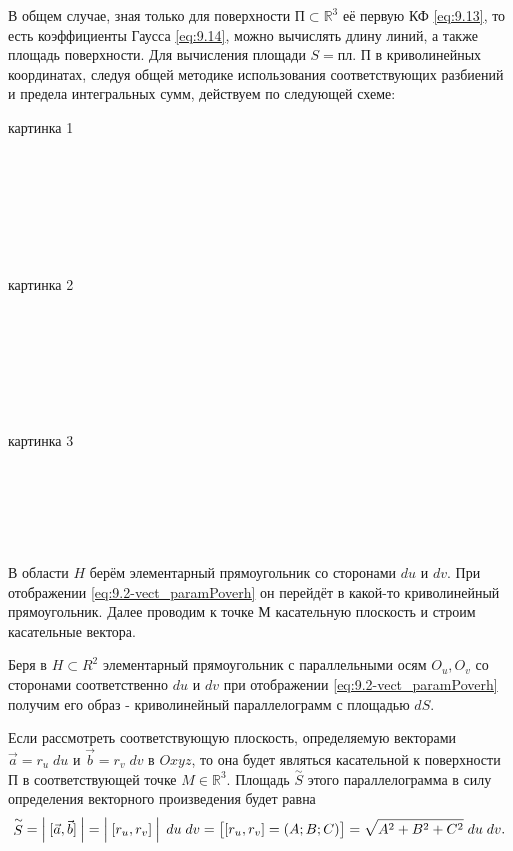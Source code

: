 \begin{example}
    В общем случае, зная только для поверхности  $ \text{П} \subset \mathbb{R}^3 $ её первую КФ \eqref{eq:9.13}, то есть коэффициенты Гаусса \eqref{eq:9.14}, можно вычислять длину линий,
    а также площадь поверхности.   
     \newpage
    Для вычисления площади $ S = \text{пл. П} $ в криволинейных координатах, следуя общей методике использования соответствующих разбиений и предела интегральных сумм, действуем по следующей схеме:
    \begin{multicols}{3}
        картинка 1 \\\\\\\\\\\\\\\\
        картинка 2 \\\\\\\\\\\\\\\\
        картинка 3 \\\\\\\\\\\\
    \end{multicols}
        
    В области $ H $ берём элементарный прямоугольник со сторонами  $ du $ и $ dv $. При отображении \eqref{eq:9.2-vect_paramPoverh} он перейдёт в какой-то криволинейный прямоугольник.
    Далее проводим к точке М касательную плоскость и строим касательные вектора.

Беря в $ H \subset R^2 $ элементарный прямоугольник с параллельными осям $ O_u, O_v $ со сторонами соответственно $ du $ и $ dv $ при отображении \eqref{eq:9.2-vect_paramPoverh}
 получим его образ - криволинейный параллелограмм с площадью $ dS $. 
 
Если рассмотреть соответствующую плоскость, определяемую векторами $ \vec{a} = r_u \; du $ и ${ \vec{b} = r_v \; dv }$ в $ Oxyz $, то она будет являться касательной к поверхности П в соответствующей точке
$ M \in \mathbb{R}^3 $. Площадь $ \stackrel{\sim}{S} $ этого параллелограмма в силу определения векторного произведения  будет равна
\begin{equation*}
    \stackrel{\sim}{S} \;  = \left\lvert \dfrac{ }{} [\vec{a},\vec{b}] \dfrac{ }{} \right\rvert =
    \left\lvert \dfrac{ }{} [r_u, r_v]\dfrac{ }{}  \right\rvert \; du \; dv =
    \left[\begin{matrix}[r_u, r_v] = (A;B;C)\end{matrix}\right] = \sqrt{ A^2 + B^2 + C^2 } \; du \; dv.
\end{equation*}


\end{example}
